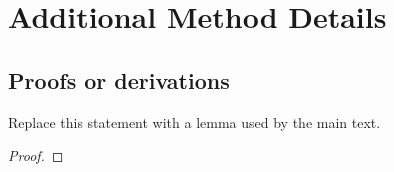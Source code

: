 \section{Additional Method Details}
\label{app:method-details}


\subsection{Proofs or derivations}

\begin{lemma}
  Replace this statement with a lemma used by the main text.
\end{lemma}

\begin{proof}
\end{proof}
